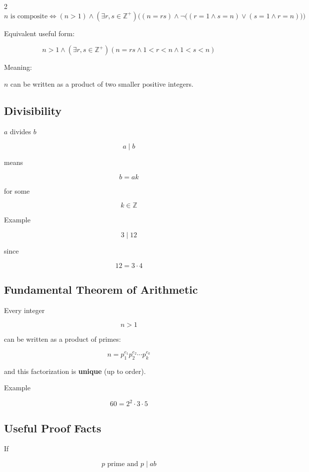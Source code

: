 \documentclass[9pt]{article}
\begin{document}
\begin{multicols}{2}
\[
n \text{ is composite} \iff (n>1) \land
(\exists r,s \in \mathbb{Z}^+)
\Big((n = rs) \land 
\neg\big((r = 1 \land s = n) \lor (s = 1 \land r = n)\big)\Big)
\]

Equivalent useful form:

\[
n>1 \land (\exists r,s \in \mathbb{Z}^+)
(n = rs \land 1<r<n \land 1<s<n)
\]

Meaning:

$n$ can be written as a product of two smaller positive integers.

\subsection*{Divisibility}

$a$ divides $b$

\[
a \mid b
\]

means

\[
b = ak
\]

for some

\[
k \in \mathbb{Z}
\]

Example

\[
3 \mid 12
\]

since

\[
12 = 3\cdot4
\]

\subsection*{Fundamental Theorem of Arithmetic}

Every integer

\[
n>1
\]

can be written as a product of primes:

\[
n = p_1^{e_1}p_2^{e_2}\cdots p_k^{e_k}
\]

and this factorization is \textbf{unique} (up to order).

Example

\[
60 = 2^2 \cdot 3 \cdot 5
\]

\subsection*{Useful Proof Facts}

If

\[
p \text{ prime and } p\mid ab
\]


\end{multicols}
\end{document}
